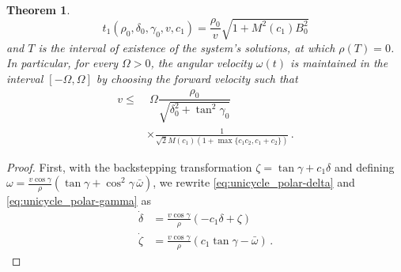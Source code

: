 \documentclass[letterpaper, 10 pt, conference]{ieeeconf}  %
\newtheorem{theorem}{Theorem}
\begin{document}
\begin{theorem}
\begin{equation}
t_1(\rho_0,\delta_0, \gamma_0, v,c_1)= \frac{\rho_0}{v}{\sqrt{1+M^2(c_1)B^2_0}}
\end{equation}
and $T$ is the interval of existence of the system's solutions, at which $\rho(T)=0$. In particular, for every $\Omega>0$, the angular velocity $\omega(t)$ is maintained in the interval $[-\Omega,\Omega]$ by choosing the forward velocity such that 
\begin{align}\label{eq-slowdown}
v\leq& \;\Omega\dfrac{\rho_0}{\sqrt{\delta_0^2 +\tan^2\gamma_0}}\nonumber\\
&\times\frac{1}{ \sqrt{2}M(c_1)(1+\max\{c_1c_2,c_1+c_2\})}\,.  
\end{align}
\end{theorem}

\begin{proof}
First, with the backstepping transformation $\zeta = \tan\gamma + c_1 \delta$ and defining $\omega = \frac{v\cos\gamma}{\rho} \left(\tan\gamma +\cos^2\gamma \, \bar\omega\right)$, we rewrite \eqref{eq:unicycle_polar-delta} and \eqref{eq:unicycle_polar-gamma} as
\begin{subequations}
\label{eq:unicycle_polar-zeta}
\begin{align}
\label{eq:unicycle_polar-delta-zeta}
\dot{\delta} &=  \frac{v\cos\gamma}{\rho} \left(-c_1\delta+\zeta\right) %
\\
\label{eq:unicycle_polar-gamma-zeta}
\dot\zeta &= 
\frac{v\cos\gamma}{\rho}\left(c_1\tan\gamma -\bar\omega\right) \,.
\end{align} 
\end{subequations}

\end{proof}
\end{document}
